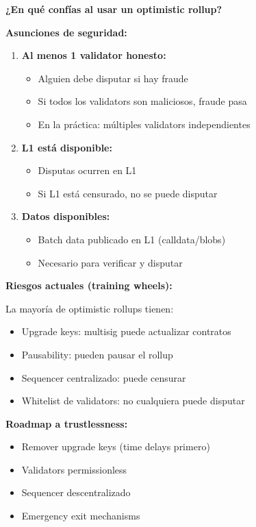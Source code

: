 \documentclass[11pt,a4paper,twoside,openright]{book}
\theoremstyle{definition}
\theoremstyle{plain}
\theoremstyle{remark}
\begin{document}
\begin{keyidea}
\textbf{¿En qué confías al usar un optimistic rollup?}

\textbf{Asunciones de seguridad:}
\begin{enumerate}
    \item \textbf{Al menos 1 validator honesto:}
    \begin{itemize}
        \item Alguien debe disputar si hay fraude
        \item Si todos los validators son maliciosos, fraude pasa
        \item En la práctica: múltiples validators independientes
    \end{itemize}
    
    \item \textbf{L1 está disponible:}
    \begin{itemize}
        \item Disputas ocurren en L1
        \item Si L1 está censurado, no se puede disputar
    \end{itemize}
    
    \item \textbf{Datos disponibles:}
    \begin{itemize}
        \item Batch data publicado en L1 (calldata/blobs)
        \item Necesario para verificar y disputar
    \end{itemize}
\end{enumerate}

\textbf{Riesgos actuales (training wheels):}

La mayoría de optimistic rollups tienen:
\begin{itemize}
    \item Upgrade keys: multisig puede actualizar contratos
    \item Pausability: pueden pausar el rollup
    \item Sequencer centralizado: puede censurar
    \item Whitelist de validators: no cualquiera puede disputar
\end{itemize}

\textbf{Roadmap a trustlessness:}
\begin{itemize}
    \item Remover upgrade keys (time delays primero)
    \item Validators permissionless
    \item Sequencer descentralizado
    \item Emergency exit mechanisms
\end{itemize}
\end{keyidea}
\end{document}
